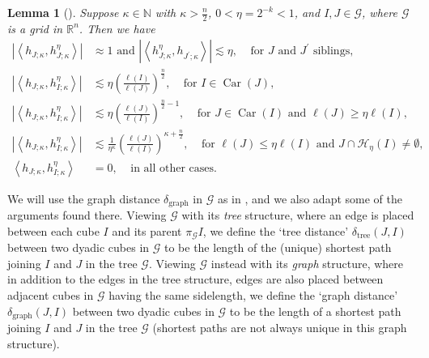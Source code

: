 \documentclass{amsart}%
\theoremstyle{plain}
\newtheorem{lemma}[theorem]{Lemma}
\numberwithin{equation}{section}
\begin{document}
\begin{lemma}
[{\cite[Lemma 19]{Saw7}}]\label{inner est}Suppose $\kappa\in\mathbb{N}$ with
$\kappa>\frac{n}{2}$, $0<\eta=2^{-k}<1$, and $I,J\in\mathcal{G}$, where
$\mathcal{G}$ is a grid in $\mathbb{R}^{n}$. Then we have%
\begin{align*}
\left\vert \left\langle h_{J;\kappa},h_{J;\kappa}^{\eta}\right\rangle
\right\vert  & \approx1\text{ and }\left\vert \left\langle h_{J;\kappa}^{\eta
},h_{J^{\prime};\kappa}\right\rangle \right\vert \lesssim\eta
,\ \ \ \ \ \text{for }J\text{ and }J^{\prime}\text{ siblings},\\
\left\vert \left\langle h_{J;\kappa},h_{I;\kappa}^{\eta}\right\rangle
\right\vert  & \lesssim\eta\left(  \frac{\ell\left(  I\right)  }{\ell\left(
J\right)  }\right)  ^{\frac{n}{2}},\ \ \ \ \ \text{for }I\in
\operatorname*{Car}\left(  J\right)  ,\\
\left\vert \left\langle h_{J;\kappa},h_{I;\kappa}^{\eta}\right\rangle
\right\vert  & \lesssim\eta\left(  \frac{\ell\left(  J\right)  }{\ell\left(
I\right)  }\right)  ^{\frac{n}{2}-1},\ \ \ \ \ \text{for }J\in
\operatorname*{Car}\left(  I\right)  \text{ and }\ell\left(  J\right)
\geq\eta\ell\left(  I\right)  ,\\
\left\vert \left\langle h_{J;\kappa},h_{I;\kappa}^{\eta}\right\rangle
\right\vert  & \lesssim\frac{1}{\eta^{\kappa}}\left(  \frac{\ell\left(
J\right)  }{\ell\left(  I\right)  }\right)  ^{\kappa+\frac{n}{2}%
},\ \ \ \ \ \text{for }\ell\left(  J\right)  \leq\eta\ell\left(  I\right)
\text{ and }J\cap\mathcal{H}_{\eta}\left(  I\right)  \neq\emptyset,\\
\left\langle h_{J;\kappa},h_{I;\kappa}^{\eta}\right\rangle  &
=0,\ \ \ \ \ \text{in all other cases}.
\end{align*}

\end{lemma}

We will use the graph distance $\delta_{\operatorname*{graph}}$ in
$\mathcal{G}$ as in \cite{Saw8}, and we also adapt some of the arguments found
there. Viewing $\mathcal{G}$ with its \emph{tree} structure, where an edge is
placed between each cube $I$ and its parent $\pi_{\mathcal{G}}I$, we define
the `tree distance' $\delta_{\operatorname*{tree}}\left(  J,I\right)  $
between two dyadic cubes in $\mathcal{G}$ to be the length of the (unique)
shortest path joining $I$ and $J$ in the tree $\mathcal{G}$. Viewing
$\mathcal{G}$ instead with its \emph{graph} structure, where in addition to
the edges in the tree structure, edges are also placed between adjacent cubes
in $\mathcal{G}$ having the same sidelength, we define the `graph distance'
$\delta_{\operatorname*{graph}}\left(  J,I\right)  $ between two dyadic cubes
in $\mathcal{G}$ to be the length of a shortest path joining $I$ and $J$ in
the tree $\mathcal{G}$ (shortest paths are not always unique in this graph structure).
\end{document}
